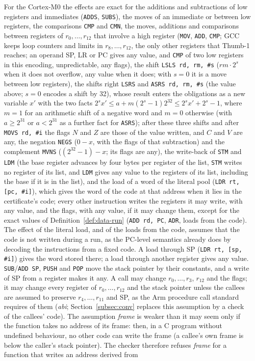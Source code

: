 \documentclass[oneside,english]{amsart}
\numberwithin{equation}{section}
\theoremstyle{plain}
\theoremstyle{definition}
\theoremstyle{plain}
\theoremstyle{plain}
\theoremstyle{remark}
\begin{document}
For the Cortex-M0 the effects are exact for the additions and subtractions of low registers and immediates (\texttt{ADDS}, \texttt{SUBS}), the moves of an immediate or between low registers, the comparisons \texttt{CMP} and \texttt{CMN}, the moves, additions and comparisons between registers of $r_0, \dots, r_{12}$ that involve a high register (\texttt{MOV}, \texttt{ADD}, \texttt{CMP}; GCC keeps loop counters and limits in $r_8, \dots, r_{12}$, the only other registers that Thumb-1 reaches; an operand SP, LR or PC gives any value, and \texttt{CMP} of two low registers in this encoding, unpredictable, any flags), the shift \texttt{LSLS rd, rm, \#s} ($\mathit{rm} \cdot 2^{s}$ when it does not overflow, any value when it does; with $s = 0$ it is a move between low registers), the shifts right \texttt{LSRS} and \texttt{ASRS rd, rm, \#s} (the value above; $s = 0$ encodes a shift by 32), whose result enters the obligations as a new variable $x'$ with the two facts $2^{s} x' \le a + m (2^{s} - 1) 2^{32} \le 2^{s} x' + 2^{s} - 1$, where $m = 1$ for an arithmetic shift of a negative word and $m = 0$ otherwise (with $a \ge 2^{31}$ or $a < 2^{31}$ as a further fact for \texttt{ASRS}); after these three shifts and after \texttt{MOVS rd, \#i} the flags $N$ and $Z$ are those of the value written, and $C$ and $V$ are any, the negation \texttt{NEGS} ($0 - x$, with the flags of that subtraction) and the complement \texttt{MVNS} ($(2^{32} - 1) - x$; its flags are any), the write-back of \texttt{STM} and \texttt{LDM} (the base register advances by four bytes per register of the list, \texttt{STM} writes no register of its list, and \texttt{LDM} gives any value to the registers of its list, including the base if it is in the list), and the load of a word of the literal pool (\texttt{LDR rt, [pc, \#i]}), which gives the word of the code at that address when it lies in the certificate's code; every other instruction writes the registers it may write, with any value, and the flags, with any value, if it may change them, except for the exact values of Definition~\ref{def:data-run} (\texttt{ADD rd, PC}, \texttt{ADR}, loads from the code). The effect of the literal load, and of the loads from the code, assumes that the code is not written during a run, as the PC-level semantics already does by decoding the instructions from a fixed code. A load through SP (\texttt{LDR rt, [sp, \#i]}) gives the word stored there; a load through another register gives any value. \texttt{SUB}/\texttt{ADD SP}, \texttt{PUSH} and \texttt{POP} move the stack pointer by their constants, and a write of SP from a register makes it any. A call may change $r_0, \dots, r_3$, $r_{12}$ and the flags; it may change every register of $r_0, \dots, r_{12}$ and the stack pointer unless the callees are assumed to preserve $r_4, \dots, r_{11}$ and SP, as the Arm procedure call standard requires of them (\emph{abi}; Section~\ref{subsec:conv} replaces this assumption by a check of the callees' code). The assumption \emph{frame} is weaker than it may seem only if the function takes no address of its frame: then, in a C program without undefined behaviour, no other code can write the frame (a callee's own frame is below the caller's stack pointer). The checker therefore refuses \emph{frame} for a function that writes an address derived from 
\end{document}
